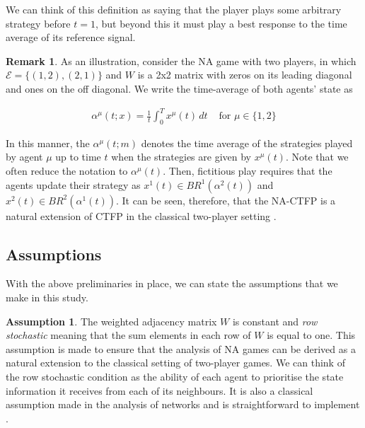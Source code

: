 \documentclass{article}
\theoremstyle{definition}
\newtheorem{assumption}{Assumption}
\newtheorem*{remark}{Remark}
\newcommand{\edgeset}{\mathcal{E}}
\newcommand{\weightset}{W}
\newcommand{\xmu}{x^{\mu}}
\begin{document}
  We can think of this definition as saying that the player plays some arbitrary strategy before
  $t = 1$, but beyond this it must play a best response to the time average of its reference
  signal.
  
  \begin{remark}
    As an illustration, consider the NA game with two players, in which $\edgeset = \{(1, 2),
    (2, 1)\}$ and $\weightset$ is a 2x2 matrix with zeros on its leading diagonal and ones on
    the off diagonal. We write the time-average of both agents' state as
  
    \begin{align}
      \alpha^\mu(t; x) = \frac{1}{t} \int_0^T \xmu(t) \, dt & \text{ for $\mu \in \{1, 2\}$}
    \end{align}

    In this manner, the $\alpha^\mu(t; m)$ denotes the time average of the strategies played by
    agent $\mu$ up to time $t$ when the strategies are given by $\xmu(t)$. Note that we often reduce the notation to $\alpha^\mu(t)$. Then, fictitious play requires that the agents update their
    strategy as $x^1(t) \in BR^1(\alpha^2(t))$ and $x^2(t) \in BR^2(\alpha^1(t))$. It can be
    seen, therefore, that the NA-CTFP is a natural extension of CTFP in the classical
    two-player setting \cite{Hofbauer2006}.
  \end{remark}

\subsection{Assumptions}

  With the above preliminaries in place, we can state the assumptions that we make in this study.

  \begin{assumption}\label{ass::rowstochastic}
    The weighted adjacency matrix $\weightset$ is constant and
    \emph{row stochastic} meaning that the sum elements in each row of
    $\weightset$ is equal to one. This assumption is made to ensure
    that the analysis of NA games can be derived as a natural
    extension to the classical setting of two-player games. We can
    think of the row stochastic condition as the ability of each agent
    to prioritise the state information it receives from each of its
    neighbours. It is also a classical assumption made in the analysis
    of networks and is straightforward to implement \cite{Mai2019}.
  \end{assumption}
\end{document}
